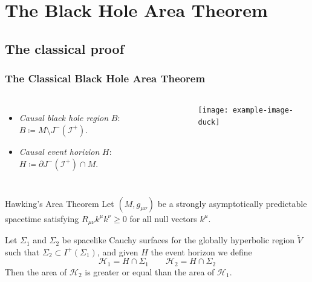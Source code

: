 \documentclass[handout]{beamer}
\begin{document}
	\section{The Black Hole Area Theorem}
	\subsection{The classical proof}
	\begin{frame}
		\frametitle{The Classical Black Hole Area Theorem}

		\begin{columns}
			\begin{itemize}
				\item \emph{Causal black hole region} \(B\): \(B \coloneqq M \setminus J^-(\mathscr{I}^+)\).
				\item \emph{Causal event horizion} \(H\): \(H\coloneqq \partial J^-(\mathscr{I}^+) \cap M \).
			\end{itemize}
		
			\texttt{[image: example-image-duck]}
		\end{columns}
		\begin{theoblock}{Hawking's Area Theorem}
			Let \((M, g_{\mu\nu})\) be a strongly asymptotically predictable spacetime satisfying \(R_{\mu\nu}k^{\mu}k^{\nu} \ge 0\) for all null vectors \(k^{\mu}\). 
			
			Let \(\Sigma_1\) and \(\Sigma_2\) be spacelike Cauchy surfaces for the globally hyperbolic region \(\tilde{V}\) such that \(\Sigma_2 \subset I^+(\Sigma_1)\), and given \(H\) the event horizon we define
			\[
			\mathscr{H}_1 = H \cap \Sigma_1 \quad \quad \mathscr{H}_2 = H \cap \Sigma_2
			\]
			Then the area of \(\mathscr{H}_2\) is greater or equal than the area of \(\mathscr{H}_1\).
		\end{theoblock}
	\end{frame}
\end{document}
